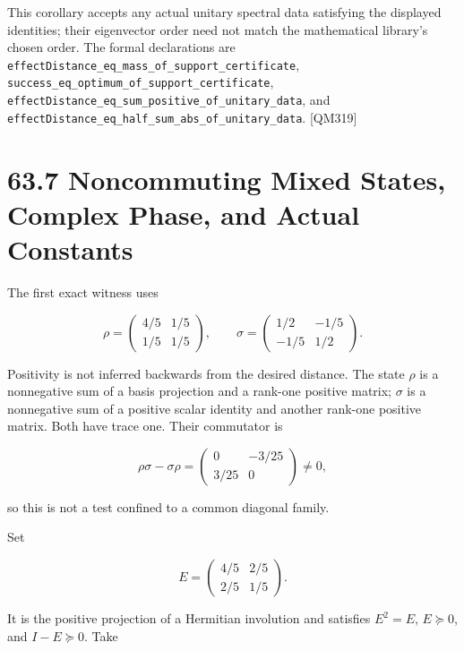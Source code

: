 \documentclass[
  11pt,
  oneside]{book}
\begin{document}
This corollary accepts any actual unitary spectral data satisfying the
displayed identities; their eigenvector order need not match the
mathematical library's chosen order. The formal declarations are
\texttt{effect\allowbreak Distance\_\allowbreak eq\_\allowbreak mass\_\allowbreak of\_\allowbreak support\_\allowbreak certificate},
\texttt{success\_\allowbreak eq\_\allowbreak optimum\_\allowbreak of\_\allowbreak support\_\allowbreak certificate},
\texttt{effect\allowbreak Distance\_\allowbreak eq\_\allowbreak sum\_\allowbreak positive\_\allowbreak of\_\allowbreak unitary\_\allowbreak data}, and
\texttt{effect\allowbreak Distance\_\allowbreak eq\_\allowbreak half\_\allowbreak sum\_\allowbreak abs\_\allowbreak of\_\allowbreak unitary\_\allowbreak data}.
{[}QM319{]}

\section{63.7 Noncommuting Mixed States, Complex Phase, and Actual
Constants}

The first exact witness uses

\[
\rho=\begin{pmatrix}4/5&1/5\\1/5&1/5\end{pmatrix},
\qquad
\sigma=\begin{pmatrix}1/2&-1/5\\-1/5&1/2\end{pmatrix}.
\]

Positivity is not inferred backwards from the desired distance. The
state \(\rho\) is a nonnegative sum of a basis projection and a rank-one
positive matrix; \(\sigma\) is a nonnegative sum of a positive scalar
identity and another rank-one positive matrix. Both have trace one.
Their commutator is

\[
\rho\sigma-\sigma\rho
=\begin{pmatrix}0&-3/25\\3/25&0\end{pmatrix}\ne0,
\]

so this is not a test confined to a common diagonal family.

Set

\[
E=\begin{pmatrix}4/5&2/5\\2/5&1/5\end{pmatrix}.
\]

It is the positive projection of a Hermitian involution and satisfies
\(E^2=E\), \(E\succeq0\), and \(I-E\succeq0\). Take
\end{document}
